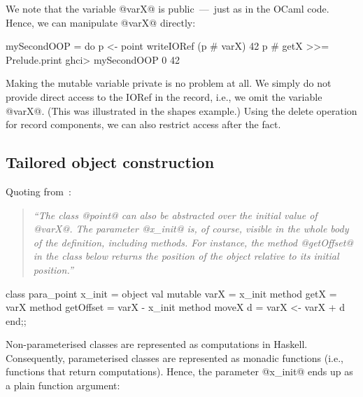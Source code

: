We note that the variable @varX@ is public~---~just as in the OCaml
code. Hence, we can manipulate @varX@ directly:

\begin{code}
 mySecondOOP =
  do 
     p <- point
     writeIORef (p # varX) 42
     p # getX >>= Prelude.print
 ghci> mySecondOOP
 0
 42
\end{code}

\noindent
Making the mutable variable private is no problem at all. We simply do
not provide direct access to the IORef in the record, i.e., we omit
the variable @varX@. (This was illustrated in the shapes example.) 
Using the delete operation for record components, we can also restrict
access after the fact.




\medskip

\subsection{Tailored object construction}

Quoting from~\cite[\S\,3.1]{OCaml}:

\begin{quote}\itshape\small
``The class @point@ can also be abstracted over the initial value of
@varX@.  The parameter @x_init@ is, of course, visible in the whole
body of the definition, including methods. For instance, the method
@getOffset@ in the class below returns the position of the object
relative to its initial position.''
\end{quote}

\begin{code}
 class para_point x_init =
   object
     val mutable varX = x_init
     method getX      = varX
     method getOffset = varX - x_init
     method moveX d   = varX <- varX + d
   end;;
\end{code}

\noindent
Non-parameterised classes are represented as computations in Haskell.
Consequently, parameterised classes are represented as monadic
functions (i.e., functions that return computations). Hence, the
parameter @x_init@ ends up as a plain function argument:

\medskip

